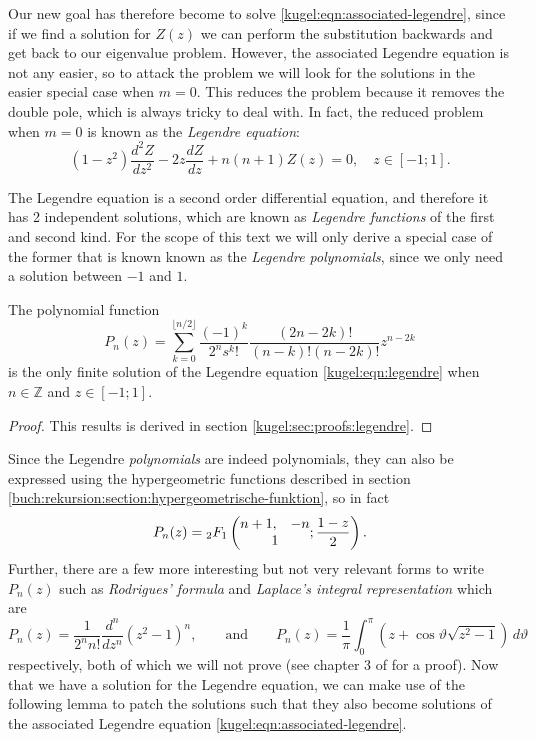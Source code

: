 Our new goal has therefore become to solve
\eqref{kugel:eqn:associated-legendre}, since if we find a solution for $Z(z)$ we
can perform the substitution backwards and get back to our eigenvalue problem.
However, the associated Legendre equation is not any easier, so to attack the
problem we will look for the solutions in the easier special case when $m = 0$.
This reduces the problem because it removes the double pole, which is always
tricky to deal with. In fact, the reduced problem when $m = 0$ is known as the
\emph{Legendre equation}:
\begin{equation} \label{kugel:eqn:legendre}
  (1 - z^2)\frac{d^2 Z}{dz^2}
  - 2z\frac{d Z}{dz}
  + n(n + 1) Z(z) = 0,
  \quad
  z \in [-1; 1].
\end{equation}

The Legendre equation is a second order differential equation, and therefore it
has 2 independent solutions, which are known as \emph{Legendre functions} of the
first and second kind. For the scope of this text we will only derive a special
case of the former that is known known as the \emph{Legendre polynomials}, since
we only need a solution between $-1$ and $1$.

\begin{lemma}
  \label{kugel:thm:legendre-poly}
  The polynomial function
  \[
    P_n(z) = \sum^{\lfloor n/2 \rfloor}_{k=0}
      \frac{(-1)^k}{2^n s^k!} \frac{(2n - 2k)!}{(n - k)! (n-2k)!} z^{n - 2k}
  \]
  is the only finite solution of the Legendre equation
  \eqref{kugel:eqn:legendre} when $n \in \mathbb{Z}$ and $z \in [-1; 1]$.
\end{lemma}
\begin{proof}
  This results is derived in section \ref{kugel:sec:proofs:legendre}.
\end{proof}

Since the Legendre \emph{polynomials} are indeed polynomials, they can also be
expressed using the hypergeometric functions described in section
\ref{buch:rekursion:section:hypergeometrische-funktion}, so in fact
\begin{equation}
  P_n(z) = {}_2F_1 \left( \begin{matrix}
    n + 1, & -n \\ \multicolumn{2}{c}{1}
  \end{matrix} ; \frac{1 - z}{2} \right).
\end{equation}
Further, there are a few more interesting but not very relevant forms to write
$P_n(z)$ such as \emph{Rodrigues' formula} and \emph{Laplace's integral
representation} which are
\begin{equation*}
  P_n(z) = \frac{1}{2^n n!} \frac{d^n}{dz^n} (z^2 - 1)^n,
  \qquad \text{and} \qquad
  P_n(z) = \frac{1}{\pi} \int_0^\pi \left(
    z + \cos\vartheta \sqrt{z^2 - 1}
  \right) \, d\vartheta
\end{equation*}
respectively, both of which we will not prove (see chapter 3 of
\cite{bell_special_2004} for a proof). Now that we have a solution for the
Legendre equation, we can make use of the following lemma to patch the solutions
such that they also become solutions of the associated Legendre equation
\eqref{kugel:eqn:associated-legendre}.

